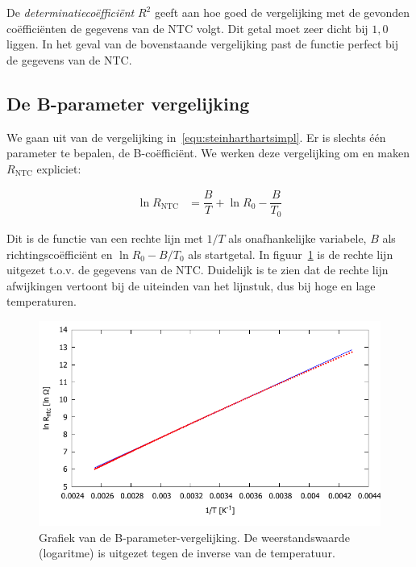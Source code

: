 \documentclass[12pt,a4paper,final,twoside,fleqn]{article}
\newcommand{\rntc}{R_\text{NTC}}
\begin{document}
De \textsl{determinatieco\"effici\"ent} $R^2$ geeft aan hoe goed de vergelijking met
de gevonden co\"effici\"enten de gegevens van de NTC volgt. Dit getal moet zeer dicht
bij $1,0$ liggen. In het geval van de bovenstaande vergelijking past de functie perfect
bij de gegevens van de NTC.

\subsection{De B-parameter vergelijking}


We gaan uit van de vergelijking in~\eqref{equ:steinharthartsimpl}. Er is slechts \'e\'en
parameter te bepalen, de B-co\"effici\"ent. We werken deze vergelijking om en maken $\rntc$
expliciet:

\begin{equation}
\begin{split}
\ln \rntc &= \dfrac{B}{T} + \ln R_0 - \dfrac{B}{T_0} 
\end{split}
\end{equation}

Dit is de functie van een rechte lijn met $1/T$ als onafhankelijke variabele, $B$
als richtingsco\"effici\"ent en $\ln R_0-B/T_0$ als startgetal.
In figuur~\ref{fig:ntc_shh_straightline_beta_fig} is de rechte lijn uitgezet t.o.v.\@
de gegevens van de NTC. Duidelijk is te zien dat de rechte lijn afwijkingen vertoont
bij de uiteinden van het lijnstuk, dus bij hoge en lage temperaturen.

\begin{figure}[t!]
\centering
\includegraphics[scale=1]{gnuplot/ntc_shh_straightline_beta_fig}
\caption[Grafiek van de B-parameter-vergelijking]{Grafiek van de B-parameter-vergelijking. De weerstandswaarde (logaritme) is uitgezet tegen de inverse van de temperatuur.}
\label{fig:ntc_shh_straightline_beta_fig}
\end{figure}
\end{document}

